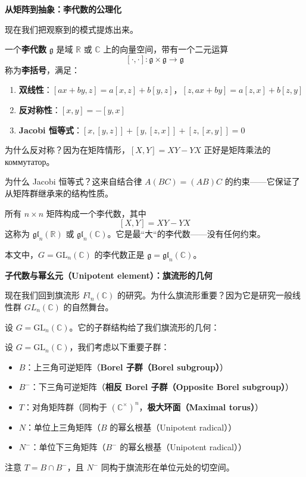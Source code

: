 \bigskip
\noindent\textbf{从矩阵到抽象：李代数的公理化}

现在我们把观察到的模式提炼出来。

\begin{Definition}[李代数]
\label{def:LieAlgebra}
一个\textbf{李代数} $\mathfrak{g}$ 是域 $\mathbb{R}$ 或 $\mathbb{C}$ 上的向量空间，带有一个二元运算
$$[\cdot, \cdot] : \mathfrak{g} \times \mathfrak{g} \to \mathfrak{g}$$
称为\textbf{李括号}，满足：
\begin{enumerate}
\item \textbf{双线性}：$[ax + by, z] = a[x,z] + b[y,z]$，$[z, ax + by] = a[z,x] + b[z,y]$
\item \textbf{反对称性}：$[x, y] = -[y, x]$
\item \textbf{Jacobi 恒等式}：$[x, [y, z]] + [y, [z, x]] + [z, [x, y]] = 0$
\end{enumerate}
\end{Definition}

为什么反对称？因为在矩阵情形，$[X,Y] = XY - YX$ 正好是矩阵乘法的 коммутатор。

为什么 Jacobi 恒等式？这来自结合律 $A(BC) = (AB)C$ 的约束——它保证了从矩阵群继承来的结构性质。

\begin{Example}
所有 $n \times n$ 矩阵构成一个李代数，其中
$$[X, Y] = XY - YX$$
这称为 $\mathfrak{gl}_n(\mathbb{R})$ 或 $\mathfrak{gl}_n(\mathbb{C})$。它是最``大``的李代数——没有任何约束。

本文中，$G = \mathrm{GL}_n(\mathbb{C})$ 的李代数正是 $\mathfrak{g} = \mathfrak{gl}_n(\mathbb{C})$。
\end{Example}

\bigskip
\noindent\textbf{子代数与幂幺元（Unipotent element）：旗流形的几何}

现在我们回到旗流形 $Fl_n(\mathbb{C})$ 的研究。为什么旗流形重要？因为它是研究一般线性群 $GL_n(\mathbb{C})$ 的自然舞台。

设 $G = \mathrm{GL}_n(\mathbb{C})$。它的子群结构给了我们旗流形的几何：

\begin{Definition}[旗流形的子群]
\label{def:AlgebraicGroup}
设 $G = \mathrm{GL}_n(\mathbb{C})$，我们考虑以下重要子群：
\begin{itemize}
\item $B$：上三角可逆矩阵（\textbf{Borel 子群（Borel subgroup）}）
\item $B^-$：下三角可逆矩阵（\textbf{相反 Borel 子群（Opposite Borel subgroup）}）
\item $T$：对角矩阵群（同构于 $(\mathbb{C}^\times)^n$，\textbf{极大环面（Maximal torus）}）
\item $N$：单位上三角矩阵（$B$ 的幂幺根基（Unipotent radical））
\item $N^-$：单位下三角矩阵（$B^-$ 的幂幺根基（Unipotent radical））
\end{itemize}
注意 $T = B \cap B^-$，且 $N^-$ 同构于旗流形在单位元处的切空间。
\end{Definition}

